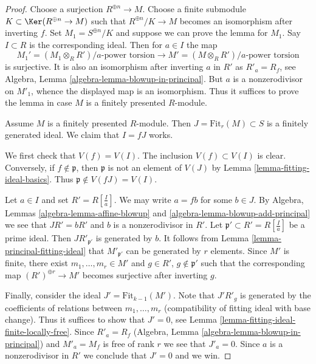 \begin{proof}
Choose a surjection $R^{\oplus n} \to M$. Choose a finite submodule
$K \subset \Ker(R^{\oplus n} \to M)$ such that $R^{\oplus n}/K \to M$
becomes an isomorphism after inverting $f$. Set $M_1 = S^{\oplus n}/K$
and suppose we can prove the lemma for $M_1$. Say $I \subset R$ is the
corresponding ideal. Then for $a \in I$ the map
$$
M_1' = (M_1 \otimes_R R')/a\text{-power torsion}
\longrightarrow
M' = (M \otimes_R R')/a\text{-power torsion}
$$
is surjective. It is also an isomorphism after inverting $a$ in $R'$
as $R'_a = R_f$, see Algebra, Lemma \ref{algebra-lemma-blowup-in-principal}.
But $a$ is a nonzerodivisor on $M'_1$, whence the displayed map is an
isomorphism. Thus it suffices to prove the lemma in case $M$ is a finitely
presented $R$-module.

\medskip\noindent
Assume $M$ is a finitely presented $R$-module.
Then $J = \text{Fit}_r(M) \subset S$ is a finitely generated ideal.
We claim that $I = fJ$ works.

\medskip\noindent
We first check that $V(f) = V(I)$. The inclusion $V(f) \subset V(I)$ is
clear. Conversely, if $f \not \in \mathfrak p$, then
$\mathfrak p$ is not an element of $V(J)$ by 
Lemma \ref{lemma-fitting-ideal-basics}.
Thus $\mathfrak p \not \in V(fJ) = V(I)$.

\medskip\noindent
Let $a \in I$ and set $R' = R[\frac{I}{a}]$. We may write $a = fb$
for some $b \in J$. By Algebra, Lemmas \ref{algebra-lemma-affine-blowup} and
\ref{algebra-lemma-blowup-add-principal} we see that $J R' = b R'$
and $b$ is a nonzerodivisor in $R'$. 
Let $\mathfrak p' \subset R' = R[\frac{I}{a}]$ be
a prime ideal. Then $JR'_{\mathfrak p'}$ is generated by $b$.
It follows from
Lemma \ref{lemma-principal-fitting-ideal}
that $M'_{\mathfrak p'}$ can be generated by $r$ elements.
Since $M'$ is finite, there exist $m_1, \ldots, m_r \in M'$ and
$g \in R'$, $g \not \in \mathfrak p'$ such that the corresponding map
$(R')^{\oplus r} \to M'$ becomes surjective after inverting $g$.

\medskip\noindent
Finally, consider the ideal $J' = \text{Fit}_{k - 1}(M')$.
Note that $J' R'_g$ is generated by the coefficients of relations between
$m_1, \ldots, m_r$ (compatibility of fitting ideal with base change).
Thus it suffices to show that $J' = 0$, see
Lemma \ref{lemma-fitting-ideal-finite-locally-free}.
Since $R'_a = R_f$ (Algebra, Lemma \ref{algebra-lemma-blowup-in-principal})
and $M'_a = M_f$ is free of rank $r$ we see that $J'_a = 0$.
Since $a$ is a nonzerodivisor in $R'$ we
conclude that $J' = 0$ and we win.
\end{proof}













